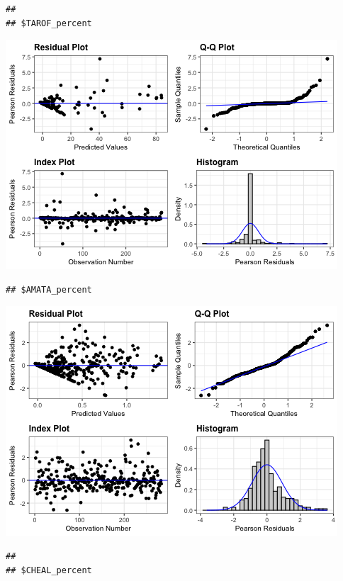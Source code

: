 \documentclass[
]{article}
\newenvironment{Shaded}{\begin{snugshade}}{\end{snugshade}}
\newcommand{\NormalTok}[1]{#1}
\newcommand{\SpecialCharTok}[1]{\textcolor[rgb]{0.81,0.36,0.00}{\textbf{#1}}}
\begin{document}
\begin{verbatim}
## 
## $TAROF_percent
\end{verbatim}

\includegraphics{Individual-sp-difference_files/figure-latex/unnamed-chunk-14-6.png}

\begin{Shaded}
\end{Shaded}

\begin{verbatim}
## $AMATA_percent
\end{verbatim}

\includegraphics{Individual-sp-difference_files/figure-latex/unnamed-chunk-15-1.png}

\begin{verbatim}
## 
## $CHEAL_percent
\end{verbatim}
\end{document}
